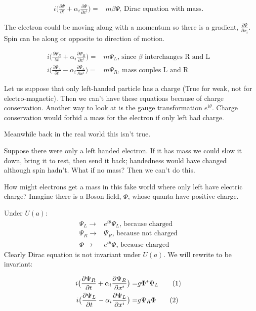 \documentclass[]{article}
\newcommand\numberthis{\addtocounter{equation}{1}\tag{\theequation}}
\begin{document}
 \begin{align*}
 	i \big(\frac{\partial \Psi}{\partial t} + \alpha_i \frac{\partial \Psi}{\partial 	x^i}\big) =&m \beta \Psi \text{, Dirac equation with mass.}
 \end{align*}
 
 The electron could be moving along with a momentum so there is a gradient, $\frac{\partial \Psi}{\partial x_i}$. Spin can be along or opposite to direction of motion. 
 
 \begin{align*}
 	i \big(\frac{\partial \Psi_R}{\partial t} + \alpha_i \frac{\partial \Psi_R}{\partial 	x^i}\big) =& m \Psi_L \text{, since $\beta$ interchanges R and L}\\
 	i \big(\frac{\partial \Psi_L}{\partial t} - \alpha_i \frac{\partial \Psi_L}{\partial 	x^i}\big) =& m \Psi_R \text{, mass couples L and R}
 \end{align*}
 
 Let us suppose that only left-handed particle has a charge (True for weak, not for electro-magnetic). Then we can't have these equations because of charge conservation. Another way to look at is the gauge transformation $e^{i\theta}$. Charge conservation would forbid a mass for the electron if only left had charge.
 
 Meanwhile back in the real world this isn't true.
 
 Suppose there were only a left handed electron. If it has mass we could slow it down, bring it to rest, then send it back; handedness would have changed although spin hadn't. What if no mass? Then we can't do this.
 
 How might electrons get a mass in this fake world where only left have electric charge? Imagine there is a Boson field, $\Phi$, whose quanta have positive charge.
 
 Under $U(a)$:
 \begin{align*}
 	\Psi_L \rightarrow& e^{i\theta} \Psi_L \text{, because charged}\\
 	\Psi_R \rightarrow& \Psi_R \text{, because not charged}\\
 	\Phi \rightarrow& e^{i\theta} \Phi \text{, because charged}
 \end{align*}
 Clearly Dirac equation is not invariant under $U(a)$. We will rewrite to be invariant:
 
 \begin{align*}
	 i \big(\frac{\partial \Psi_R}{\partial t} + \alpha_i \frac{\partial \Psi_R}{\partial 	x^i}\big) =& g \Phi^* \Psi_L \numberthis \label{eq:mod:Dirac:R}\\
	 i \big(\frac{\partial \Psi_L}{\partial t} - \alpha_i \frac{\partial \Psi_L}{\partial 	x^i}\big) =& g \Psi_R \Phi \numberthis \label{eq:mod:Dirac:L}
 \end{align*}
 
\end{document}
